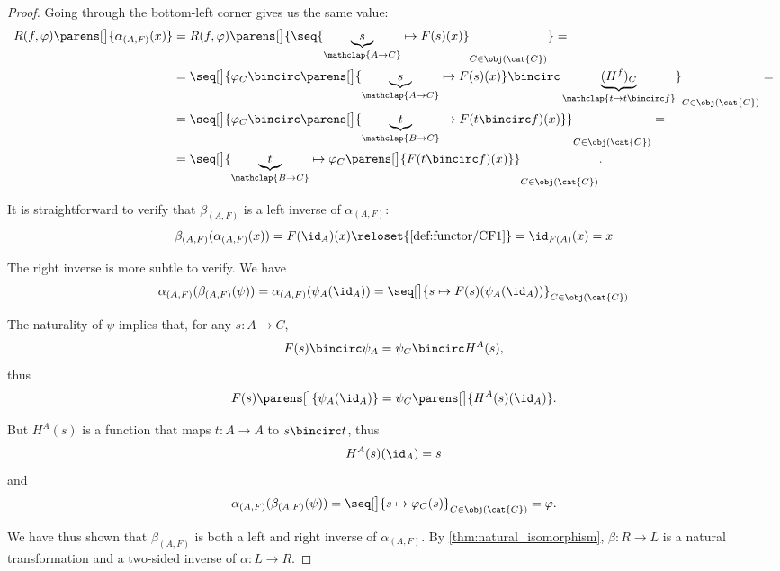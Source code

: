 \begin{proof}
  Going through the bottom-left corner gives us the same value:
  \begin{align*}
    R(f, \varphi)\parens[\big]{ \alpha_{(A, F)}(x) }
    &=
    R(f, \varphi)\parens[\big]{ \seq{ \underbrace{s}_{\mathclap{A \to C}} \mapsto F(s)(x) }_{C \in \obj(\cat{C})} }
    = \\ &=
    \seq[\big]{ \varphi_C \bincirc \parens[\big]{ \underbrace{s}_{\mathclap{A \to C}} \mapsto F(s)(x) } \bincirc \underbrace{(H^f)_C}_{\mathclap{t \mapsto t \bincirc f}} }_{C \in \obj(\cat{C})}
    = \\ &=
    \seq[\big]{ \varphi_C \bincirc \parens[\big]{ \underbrace{t}_{\mathclap{B \to C}} \mapsto F(t \bincirc f)(x) } }_{C \in \obj(\cat{C})}
    = \\ &=
    \seq[\big]{ \underbrace{t}_{\mathclap{B \to C}} \mapsto \varphi_C\parens[\big]{ F(t \bincirc f)(x) } }_{C \in \obj(\cat{C})}.
  \end{align*}

   It is straightforward to verify that \( \beta_{(A, F)} \) is a left inverse of \( \alpha_{(A, F)} \):
  \begin{equation*}
    \beta_{(A, F)}(\alpha_{(A, F)}(x))
    =
    F(\id_A)(x)
    \reloset {\ref{def:functor/CF1}} =
    \id_{F(A)}(x)
    =
    x
  \end{equation*}

  The right inverse is more subtle to verify. We have
  \begin{equation*}
    \alpha_{(A, F)}(\beta_{(A, F)}(\psi))
    =
    \alpha_{(A, F)}(\psi_A(\id_A))
    =
    \seq[\big]{ s \mapsto F(s)(\psi_A(\id_A)) }_{C \in \obj(\cat{C})}
  \end{equation*}

  The naturality of \( \psi \) implies that, for any \( s: A \to C \),
  \begin{equation*}
    F(s) \bincirc \psi_A = \psi_C \bincirc H^A(s),
  \end{equation*}
  thus
  \begin{equation*}
    F(s)\parens[\big]{ \psi_A(\id_A) } = \psi_C\parens[\big]{ H^A(s)(\id_A) }.
  \end{equation*}

  But \( H^A(s) \) is a function that maps \( t: A \to A \) to \( s \bincirc t \), thus
  \begin{equation*}
    H^A(s)(\id_A) = s
  \end{equation*}
  and
  \begin{equation*}
    \alpha_{(A, F)}(\beta_{(A, F)}(\psi))
    =
    \seq[\big]{ s \mapsto \varphi_C(s) }_{C \in \obj(\cat{C})}
    =
    \varphi.
  \end{equation*}

  We have thus shown that \( \beta_{(A, F)} \) is both a left and right inverse of \( \alpha_{(A, F)} \). By \cref{thm:natural_isomorphism}, \( \beta: R \to L \) is a natural transformation and a two-sided inverse of \( \alpha: L \to R \).
\end{proof}

